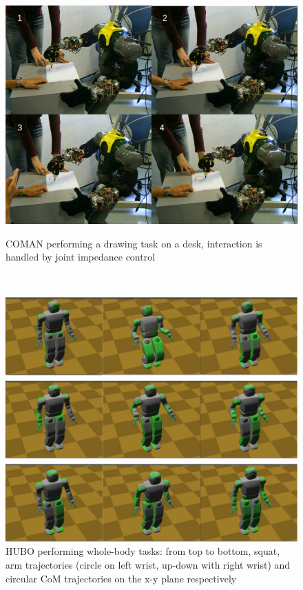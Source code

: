 \begin{figure}
\begin{minipage}[b]{7.7cm}
        \centering
        \includegraphics[width=1.0\textwidth]{images/soft_interaction/sot_love.png}
        \vspace{1mm}
        \caption{COMAN performing a drawing task on a desk, interaction is handled by joint impedance control\vspace{5mm}}
        \label{COMAN_love}
\end{minipage}
 \ \hspace{3mm} \
\begin{minipage}[b]{7.7cm}
        \centering
        \includegraphics[width=1.0\textwidth]{images/soft_interaction/hubo.eps}
        \caption{HUBO performing whole-body tasks: from top to bottom, squat, arm trajectories (circle on left wrist, up-down with right wrist) and circular CoM trajectories on the x-y plane respectively}
        \label{fig:HUBO}
\end{minipage}
\end{figure}

